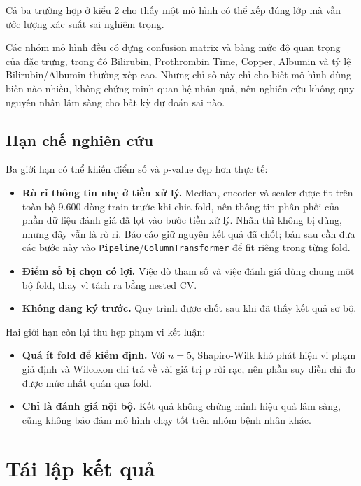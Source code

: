 \documentclass[12pt]{template/ai_conquer2026}
\begin{document}
\noindent Cả ba trường hợp ở kiểu 2 cho thấy một mô hình có thể xếp đúng lớp mà
vẫn ước lượng xác suất sai nghiêm trọng.

Các nhóm mô hình đều có dựng confusion matrix và bảng mức độ quan trọng của đặc
trưng, trong đó Bilirubin, Prothrombin Time, Copper, Albumin và tỷ lệ
Bilirubin/Albumin thường xếp cao. Nhưng chỉ số này chỉ cho biết mô hình dùng biến
nào nhiều, không chứng minh quan hệ nhân quả, nên nghiên cứu không quy nguyên nhân
lâm sàng cho bất kỳ dự đoán sai nào.

\subsection{Hạn chế nghiên cứu}
\label{sec:limit}

Ba giới hạn có thể khiến điểm số và p-value đẹp hơn thực tế:

\begin{itemize}
\item \textbf{Rò rỉ thông tin nhẹ ở tiền xử lý.} Median, encoder và scaler được
fit trên toàn bộ 9.600 dòng train trước khi chia fold, nên thông tin phân phối của
phần dữ liệu đánh giá đã lọt vào bước tiền xử lý. Nhãn thì không bị dùng, nhưng
đây vẫn là rò rỉ. Báo cáo giữ nguyên kết quả đã chốt; bản sau cần đưa các bước này
vào \texttt{Pipeline}/\texttt{ColumnTransformer} để fit riêng trong từng fold.
\item \textbf{Điểm số bị chọn có lợi.} Việc dò tham số và việc đánh giá dùng chung
một bộ fold, thay vì tách ra bằng nested CV.
\item \textbf{Không đăng ký trước.} Quy trình được chốt sau khi đã thấy kết quả sơ
bộ.
\end{itemize}

\noindent Hai giới hạn còn lại thu hẹp phạm vi kết luận:

\begin{itemize}
\item \textbf{Quá ít fold để kiểm định.} Với $n=5$, Shapiro-Wilk khó phát hiện vi
phạm giả định và Wilcoxon chỉ trả về vài giá trị p rời rạc, nên phần suy diễn chỉ
đo được mức nhất quán qua fold.
\item \textbf{Chỉ là đánh giá nội bộ.} Kết quả không chứng minh hiệu quả lâm sàng,
cũng không bảo đảm mô hình chạy tốt trên nhóm bệnh nhân khác.
\end{itemize}

\section{Tái lập kết quả}
\label{sec:repro}
\end{document}
